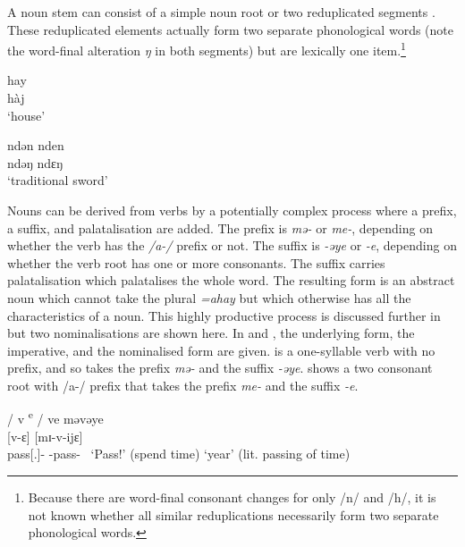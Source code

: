 A noun stem can consist of a simple noun root  or two reduplicated segments . These reduplicated elements actually form two separate phonological words (note the word-final alteration \textit{ŋ} in both segments) but are lexically one item.\footnote{Because there are word-final consonant changes for only /n/ and /h/, it is not known whether all similar reduplications necessarily form two separate phonological words.} 


\ea \label{ex:4:16}
hay\\
  hàj\\
\glt  ‘house’
\z

\ea \label{ex:4:17}
ndən nden\\
  ndəŋ ndɛŋ\\
\glt  ‘traditional sword’
\z

Nouns can be derived from verbs by a potentially complex process where a prefix, a suffix, and palatalisation are added. The prefix is \textit{mə-} or \textit{me-}, depending on whether the verb has the \textit{/a-/} prefix or not. The suffix is \textit{-əye} or \textit{-e}, depending on whether the verb root has one or more consonants. The suffix carries palatalisation which palatalises the whole word. The resulting form is an abstract noun which cannot take the plural \textit{=ahay} but which otherwise has all the characteristics of a noun. This highly productive process is discussed further in  but two nominalisations are shown here. In  and , the underlying form, the {\twoS} imperative, and the nominalised form are given.  is a one-syllable verb with no prefix, and so takes the prefix \textit{mə-} and the suffix \textit{{}-əye}.  shows a two consonant root with /a-/ prefix that takes the prefix \textit{me-} and the suffix \textit{{}-e}.

\ea \label{ex:4:18}
\textup{/ v \textsuperscript{e} / \hspace{30pt} ve  \hspace{82pt}    məvəye}\\
\hspace{55pt} [v-ɛ]  \hspace{74pt}    [mɪ-v-ijɛ]\\
\hspace{55pt}      pass[{\twoS}.{\IMP}]-{\CL} \hspace{27pt} {\NOM}{}-pass-{\CL}\
\glt \hspace{55pt} ‘Pass!’ (spend time) \hspace{10pt} ‘year’ (lit. passing of time)
\z

